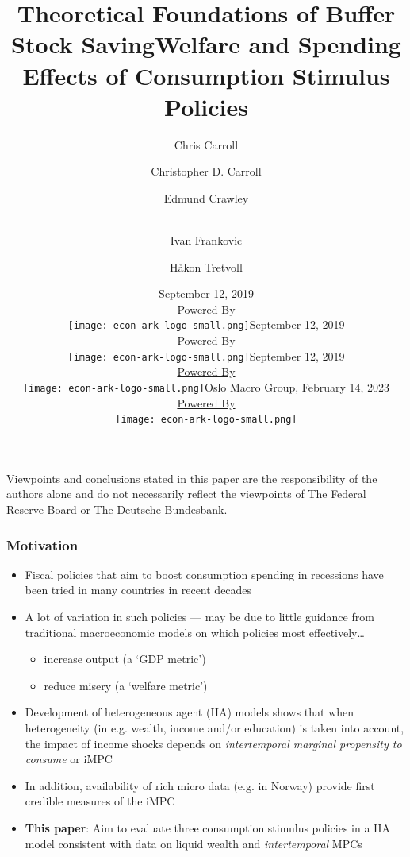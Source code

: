 \documentclass[pdflatex,aspectratio=169]{beamer}
\title[Buffer Stock Theory]{Theoretical Foundations of Buffer Stock Saving}
\author[Carroll]{Chris Carroll}
\institute[JHU]{Johns Hopkins University}
\date[\today]{September 12, 2019  \\ \medskip \medskip \medskip \href{https://econ-ark.org/}{\small Powered By} \\ \texttt{[image: econ-ark-logo-small.png]}}
\title[Stimulus]{Welfare and Spending Effects of Consumption Stimulus Policies}
\author{
  Christopher D. Carroll
  \and
  Edmund Crawley
  \and \\
  Ivan Frankovic
  \and
  H{\aa}kon Tretvoll
}
\date[\today]{September 12, 2019  \\ \medskip \medskip \medskip \href{https://econ-ark.org/}{\small Powered By} \\ \texttt{[image: econ-ark-logo-small.png]}}
\date[\today]{September 12, 2019  \\ \medskip \medskip \medskip \href{https://econ-ark.org/}{\small Powered By} \\ \texttt{[image: econ-ark-logo-small.png]}}
\date[\today]{Oslo Macro Group, February 14, 2023  \\ \medskip \medskip \medskip 
	\href{https://econ-ark.org/}{\small Powered By} \\ \texttt{[image: econ-ark-logo-small.png]}}
\begin{document}


\begin{frame}[plain]
  \titlepage

\footnotesize{Viewpoints and conclusions stated in this paper are the responsibility of the authors alone and do not necessarily reflect the viewpoints of The Federal Reserve Board or The Deutsche Bundesbank.}
\end{frame}




	
	
\begin{frame}
\frametitle{Motivation}
\begin{itemize}
	\itemsep = .5\bigskipamount 
	\item Fiscal policies that aim to boost consumption spending in recessions have been tried in many countries in recent decades 
	\item A lot of variation in such policies --- may be due to little guidance from traditional macroeconomic models on which policies most effectively\ldots 
		\begin{itemize}
		\itemsep = .25\bigskipamount 
		\item increase output (a `GDP metric')
		\item reduce misery (a `welfare metric')
		\end{itemize}
	\item Development of heterogeneous agent (HA) models shows that when heterogeneity (in e.g. wealth, income and/or education) is taken into account, the impact of income shocks depends on \textit{intertemporal marginal propensity to consume} or iMPC 
	\item In addition, availability of rich micro data (e.g. in Norway) provide first credible measures of the iMPC 
	\item \textbf{This paper}: Aim to evaluate three consumption stimulus policies in a HA model consistent with data on liquid wealth and \textit{intertemporal} MPCs 
\end{itemize}
\end{frame}
\end{document}
